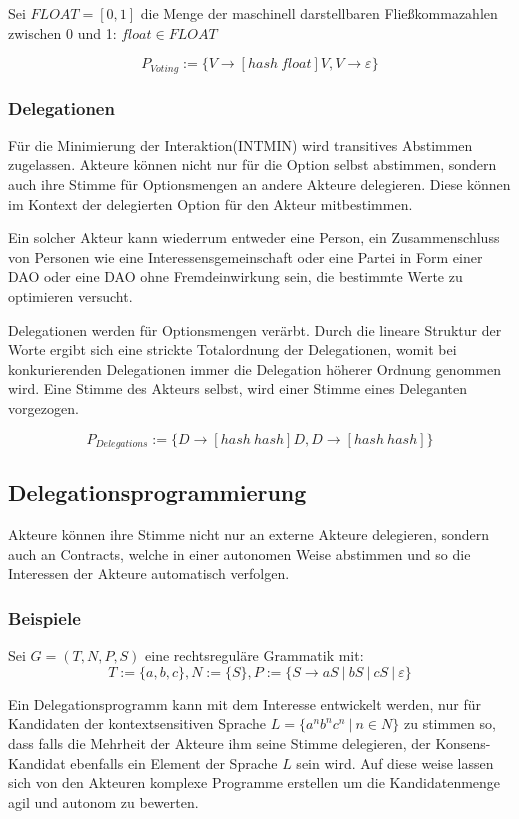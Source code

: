 \documentclass[a4paper,12pt]{article}
\begin{document}
Sei $FLOAT = [0,1]$ die Menge der maschinell darstellbaren Fließkommazahlen zwischen 0 und 1: $float\in FLOAT$

\[ P_{Voting} := \{V\rightarrow [hash\ float]V, V \rightarrow \varepsilon\} \] 
  


\subsubsection*{Delegationen}

Für die Minimierung der Interaktion(INTMIN) wird transitives Abstimmen zugelassen. Akteure können nicht nur für die Option selbst abstimmen, sondern auch ihre Stimme für Optionsmengen an andere Akteure delegieren. Diese können im Kontext der delegierten Option für den Akteur mitbestimmen.

Ein solcher Akteur kann wiederrum entweder eine Person, ein Zusammenschluss von Personen wie eine Interessensgemeinschaft oder eine Partei in Form einer DAO oder eine DAO ohne Fremdeinwirkung sein, die bestimmte Werte zu optimieren versucht.

Delegationen werden für Optionsmengen verärbt. Durch die lineare Struktur der Worte ergibt sich eine strickte Totalordnung der Delegationen, womit bei konkurierenden Delegationen immer die Delegation höherer Ordnung genommen wird. Eine Stimme des Akteurs selbst, wird einer Stimme eines Deleganten vorgezogen.

\[ P_{Delegations} := \{D\rightarrow [hash\ hash]D,D\rightarrow [hash\ hash]\} \] 


\subsection{Delegationsprogrammierung}
Akteure können ihre Stimme nicht nur an externe Akteure delegieren, sondern auch an Contracts, welche in einer autonomen Weise abstimmen und so die Interessen der Akteure automatisch verfolgen. 

\subsubsection*{Beispiele}

Sei $G=(T,N,P,S)$ eine rechtsreguläre Grammatik mit:
\[ T:=\{ a, b, c \}, N:=\{S\}, P:= \{S\rightarrow aS\ |\ bS\ |\ cS\ |\ \varepsilon \} \] 

Ein Delegationsprogramm kann mit dem Interesse entwickelt werden, nur für Kandidaten der kontextsensitiven Sprache $L = \{ a^nb^nc^n\ |\ n\in N\}$ zu stimmen so, dass falls die Mehrheit der Akteure ihm seine Stimme delegieren, der Konsens-Kandidat ebenfalls ein Element der Sprache $L$ sein wird. Auf diese weise lassen sich von den Akteuren komplexe Programme erstellen um die Kandidatenmenge agil und autonom zu bewerten.
\end{document}
